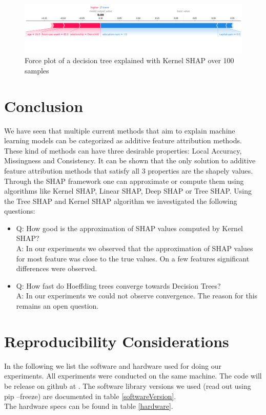 \documentclass[conference]{IEEEtran}
\begin{document}
\begin{figure}[htbp]
\centerline{
	\includegraphics[width=\textwidth]{../fig/ex_02_KernelShap_100_Samples_ForcePlot_sample_1.png}
}
\caption{Force plot of a decision tree explained with Kernel SHAP over 100 samples}
\label{fig9}
\end{figure}


\section{Conclusion}
\label{Conclusion}
We have seen that multiple current methods that aim to explain machine learning models can be categorized as additive feature attribution methods. 
These kind of methods can have three desirable properties: Local Accuracy, Missingness and Consistency.
It can be shown that the only solution to additive feature attribution methods that satisfy all 3 properties are the shapely values.
Through the SHAP framework one can approximate or compute them using algorithms like Kernel SHAP, Linear SHAP, Deep SHAP or Tree SHAP.
Using the Tree SHAP and Kernel SHAP algorithm we investigated the following questions:
\begin{itemize}
	\item Q: How good is the approximation of SHAP values computed by Kernel SHAP?\\
		  A: In our experiments we observed that the approximation of SHAP values for most feature was close to the true values. On a few features significant differences were observed.  
	\item Q: How fast do Hoeffding trees converge towards Decision Trees?\\
		  A: In our experiments we could not observe convergence. The reason for this remains an open question.
\end{itemize}

\section{Reproducibility Considerations} 
\label{Reproducibility}

In the following we list the software and hardware used for doing our experiments. 
All experiments were conducted on the same machine.
The code will be release on github at \cite{b17}.
The software library versions we used (read out using pip --freeze) are documented in table \ref{softwareVersion}.\\
 The hardware specs can be found in table \ref{hardware}.\\
\end{document}
